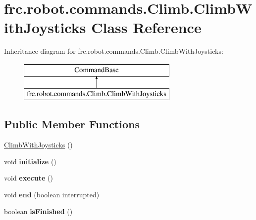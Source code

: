 \hypertarget{classfrc_1_1robot_1_1commands_1_1_climb_1_1_climb_with_joysticks}{}\section{frc.\+robot.\+commands.\+Climb.\+Climb\+With\+Joysticks Class Reference}
\label{classfrc_1_1robot_1_1commands_1_1_climb_1_1_climb_with_joysticks}
Inheritance diagram for frc.\+robot.\+commands.\+Climb.\+Climb\+With\+Joysticks\+:\begin{figure}[H]
\begin{center}
\leavevmode
\includegraphics[height=2.000000cm]{classfrc_1_1robot_1_1commands_1_1_climb_1_1_climb_with_joysticks}
\end{center}
\end{figure}
\subsection*{Public Member Functions}
\begin{DoxyCompactItemize}
\item 
\mbox{\hyperlink{classfrc_1_1robot_1_1commands_1_1_climb_1_1_climb_with_joysticks_a99951d20cc4b0aa639c948a37860c562}{Climb\+With\+Joysticks}} ()
\item 
\mbox{\label{classfrc_1_1robot_1_1commands_1_1_climb_1_1_climb_with_joysticks_a1c4299bf755fbfc6de2ebcd234bb8d50}} 
void {\bfseries initialize} ()
\item 
\mbox{\label{classfrc_1_1robot_1_1commands_1_1_climb_1_1_climb_with_joysticks_a7d825f0a72a0003c94269e456604ba14}} 
void {\bfseries execute} ()
\item 
\mbox{\label{classfrc_1_1robot_1_1commands_1_1_climb_1_1_climb_with_joysticks_ac68569c81e214b958f2b7195edd3b972}} 
void {\bfseries end} (boolean interrupted)
\item 
\mbox{\label{classfrc_1_1robot_1_1commands_1_1_climb_1_1_climb_with_joysticks_a30a1f95e6ca413c0191ac51a530ff866}} 
boolean {\bfseries is\+Finished} ()
\end{DoxyCompactItemize}


